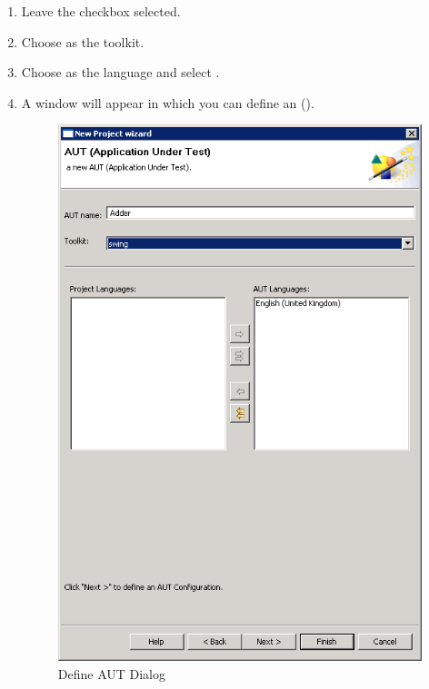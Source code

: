 \begin{enumerate}
\item Leave the  checkbox selected.
\item Choose  as the toolkit.
\item Choose  as the \gdproject{} language and select .
\item A window will appear in which you can define an \gdaut{} ().

\begin{figure}[h]
\begin{center}
\includegraphics[width=12cm]{Tutorials/PS/TutDefineAUT}
\caption{Define AUT Dialog}
\label{TutDefineAUT}
\end{center}
\end{figure}
 

\end{enumerate}
